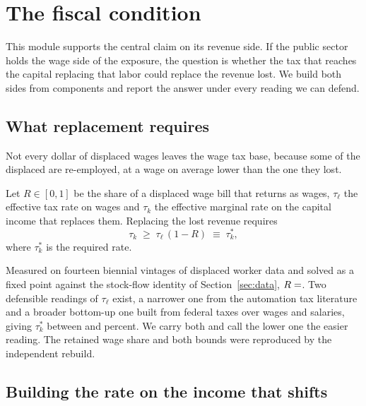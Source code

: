 \section{The fiscal condition}
\label{sec:fiscal}

This module supports the central claim on its revenue side. If the public sector holds the wage
side of the exposure, the question is whether the tax that reaches the capital replacing that
labor could replace the revenue lost. We build both sides from components and report the answer
under every reading we can defend.

\subsection{What replacement requires}

Not every dollar of displaced wages leaves the wage tax base, because some of the displaced are
re-employed, at a wage on average lower than the one they lost.

\begin{definition}
\label{def:condition}
Let $R \in [0,1]$ be the share of a displaced wage bill that returns as wages, $\tau_\ell$ the
effective tax rate on wages and $\tau_k$ the effective marginal rate on the capital income that
replaces them. Replacing the lost revenue requires
\begin{equation}
\tau_k \;\ge\; \tau_\ell\,(1 - R) \;\equiv\; \tau_k^{\ast},
\label{eq:condition}
\end{equation}
where $\tau_k^{\ast}$ is the required rate.
\end{definition}

Measured on fourteen biennial vintages of displaced worker data and solved as a fixed point
against the stock-flow identity of Section~\ref{sec:data}, $R = \result{RetainedWageShare}$. Two
defensible readings of $\tau_\ell$ exist, a narrower one from the automation tax literature and a
broader bottom-up one built from federal taxes over wages and salaries, giving
$\tau_k^{\ast}$ between  and  percent. We carry both and
call the lower one the easier reading. The retained wage share and both bounds were reproduced by
the independent rebuild.

\subsection{Building the rate on the income that shifts}

